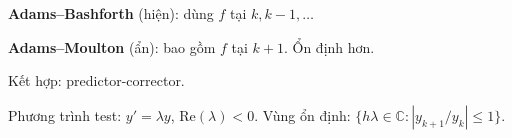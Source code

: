 \documentclass[12pt,a4paper]{article}
\begin{document}
\begin{phuongphap}[title={Phương pháp đa bước (Adams)}]
  \textbf{Adams--Bashforth} (hiện): dùng $f$ tại $k, k-1, \ldots$

  \textbf{Adams--Moulton} (ẩn): bao gồm $f$ tại $k+1$. Ổn định hơn.

  Kết hợp: predictor-corrector.
\end{phuongphap}

\begin{dinhnghia}[title={Ổn định tuyệt đối}]
  Phương trình test: $y' = \lambda y$, $\text{Re}(\lambda) < 0$. Vùng ổn định: $\{h\lambda \in \mathbb{C} : |y_{k+1}/y_k| \le 1\}$.
\end{dinhnghia}
\end{document}
